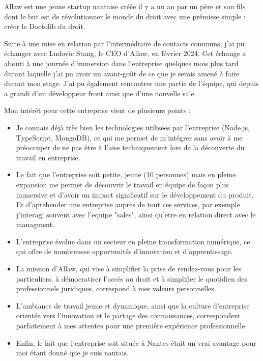 Allaw est une jeune startup nantaise créée il y a un an par un père et son fils
dont le but est de révolutionner le monde du droit avec une prémisse simple :
créer le Doctolib du droit.

Suite à une mise en relation par l'intermédiaire de contacts communs, j'ai
pu échanger avec Ludovic Stang, le CEO d'Allaw, en février 2024. Cet échange
a abouti à une journée d'immersion dans l'entreprise quelques mois plus tard
durant laquelle j'ai pu avoir un avant-goût de ce que je serais amené à faire
durant mon stage. J'ai pu également rencontrer une partie de l'équipe, qui
depuis a grandi d'un développeur front ainsi que d'une nouvelle sale.

Mon intérêt pour cette entreprise vient de plusieurs points :
\begin{itemize}
  \item Je connais déjà très bien les technologies utilisées par l'entreprise
        (Node.js, TypeScript, MongoDB),
        ce qui me permet de m'intégrer sans avoir à me préoccuper de ne pas
        être à l'aise techniquement lors de la découverte du travail en entreprise.

  \item Le fait que l'entreprise soit petite, jeune (10 personnes) mais en pleine expansion
        me permet de découvrir le travail en équipe de façon plus immersive et
        d'avoir un impact significatif sur le développement du produit.
        Et d'aprehender une entreprise aupres de tout ces services, par exemple
        j'interagi souvent avec l'equipe "sales", ainsi qu'etre en relation direct
        avec le managment.

  \item L'entreprise évolue dans un secteur en pleine transformation numérique,
        ce qui offre de nombreuses opportunités d'innovation et d'apprentissage.

  \item La mission d'Allaw, qui vise à simplifier la prise de rendez-vous pour les
        particuliers, à démocratiser l'accès au droit et à simplifier le quotidien des
        professionnels juridiques, correspond à mes valeurs personnelles.

  \item L'ambiance de travail jeune et dynamique, ainsi que la culture d'entreprise
        orientée vers l'innovation et le partage des connaissances, correspondent
        parfaitement à mes attentes pour une première expérience professionnelle.

  \item Enfin, le fait que l'entreprise soit située à Nantes était un vrai
        avantage pour moi étant donné que je suis nantais.
\end{itemize}

